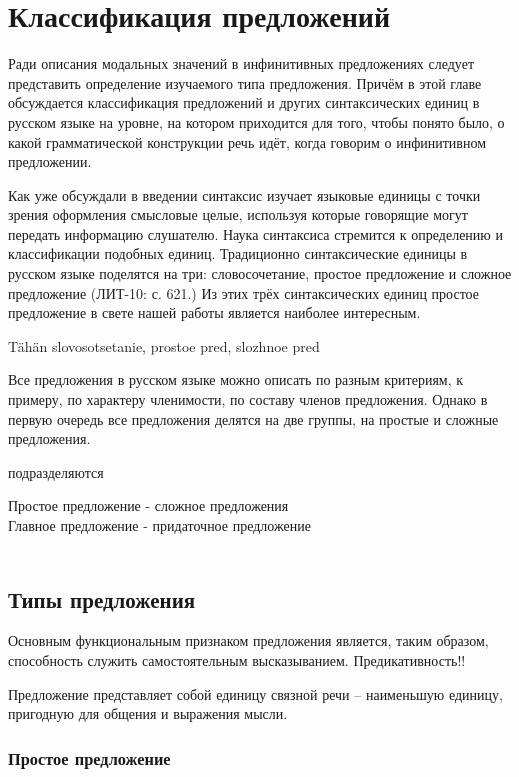 \section{Классификация предложений}

Ради описания модальных значений в инфинитивных предложениях следует представить определение изучаемого типа предложения. Причём в этой главе обсуждается классификация предложений и других синтаксических единиц в русском языке на уровне, на котором приходится для того, чтобы понято было, о какой грамматической конструкции речь идёт, когда говорим о инфинитивном предложении.

Как уже обсуждали в введении синтаксис изучает языковые единицы с точки зрения оформления смысловые целые, используя которые говорящие могут передать информацию слушателю. Наука синтаксиса стремится к определению и классификации подобных единиц. Традиционно синтаксические единицы в русском языке поделятся на три: словосочетание, простое предложение и сложное предложение (ЛИТ-10: с. 621.) Из этих трёх синтаксических единиц простое предложение в свете нашей работы является наиболее интересным. 



Tähän slovosotsetanie, prostoe pred, slozhnoe pred



Все предложения в русском языке можно описать по разным критериям, к примеру, по характеру членимости, по составу членов предложения. Однако в первую очередь все предложения делятся на две группы, на простые и  сложные предложения. 

подразделяются 

Простое предложение - сложное предложения \\
Главное предложение - придаточное предложение \\
\\

\subsection{Типы предложения}

Основным функциональным признаком предложения является, таким образом, способность служить самостоятельным высказыванием. Предикативность!!

Предложение представляет собой единицу связной речи -- наименьшую единицу, пригодную для общения и выражения мысли.

\subsubsection{Простое предложение}



